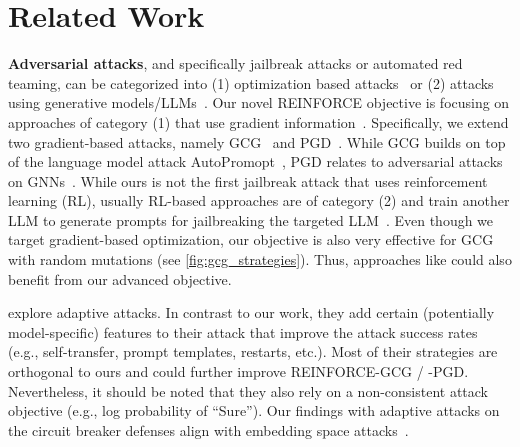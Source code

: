 \section{Related Work}
\textbf{Adversarial attacks}, and specifically jailbreak attacks or automated red teaming, can be categorized into (1) optimization based attacks~\citep{wallace_universal_2021, shin_autoprompt_2020, guo_gradient-based_2021, zou_universal_2023, geisler_attacking_2024, guo_cold-attack_2024, wen_hard_2023, kumar_gradient-based_2022, hou_textgrad_2023,liu_autodan_2024,zhu_autodan_2023,andriushchenko_jailbreaking_2025,schwinn_soft_2024,hughes_best--n_2024,sadasivan_fast_2024,thompson_flrt_2024} or (2) attacks using generative models/LLMs~\citep{perez_red_2022, mehrotra_tree_2023, chao_jailbreaking_2023,liao_amplegcg_2024,chen_rl-jack_2024,jha_llmstinger_2024,lin_pathseeker_2024}. Our novel REINFORCE objective is focusing on approaches of category (1) that use gradient information~\citep{wallace_universal_2021, shin_autoprompt_2020, guo_gradient-based_2021, zou_universal_2023, geisler_attacking_2024, guo_cold-attack_2024, wen_hard_2023, kumar_gradient-based_2022, hou_textgrad_2023,zhu_autodan_2023}. Specifically, we extend two gradient-based attacks, namely GCG~\citep{zou_universal_2023} and PGD~\citep{geisler_attacking_2024}. While GCG builds on top of the language model attack AutoPromopt~\citep{shin_autoprompt_2020}, PGD relates to adversarial attacks on GNNs~\citep{xu_adversarial_2020, geisler_attacking_2021,gosch_adversarial_2023,foth_relaxing_2024}. 
While ours is not the first jailbreak attack that uses reinforcement learning (RL), usually RL-based approaches are of category (2) and train another LLM to generate prompts for jailbreaking the targeted LLM~\citep{perez_red_2022, mehrotra_tree_2023, chao_jailbreaking_2023, chen_rl-jack_2024,jha_llmstinger_2024, lin_pathseeker_2024}. 
Even though we target gradient-based optimization, our objective is also very effective for GCG with random mutations (see \autoref{fig:gcg_strategies}). Thus, approaches like \citet{andriushchenko_jailbreaking_2025,liu_autodan_2024} could also benefit from our advanced objective.

\citet{andriushchenko_jailbreaking_2025} explore adaptive attacks. In contrast to our work, they add certain (potentially model-specific) features to their attack that improve the attack success rates (e.g., self-transfer, prompt templates, restarts, etc.). Most of their strategies are orthogonal to ours and could further improve REINFORCE-GCG / -PGD. Nevertheless, it should be noted that they also rely on a non-consistent attack objective (e.g., log probability of ``Sure''). Our findings with adaptive attacks on the circuit breaker defenses align with embedding space attacks~\cite {schwinn_revisiting_2024}.

